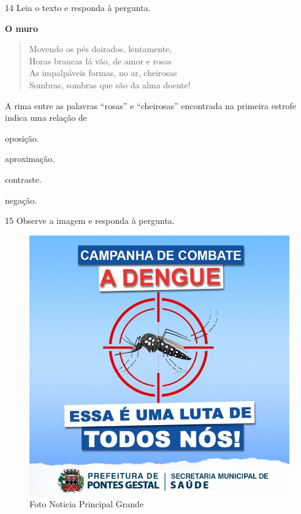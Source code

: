 \num{14} Leia o texto e responda à pergunta.

\textbf{O muro}

\begin{verse}
Movendo os pés doirados, lentamente,\\
Horas brancas lá vão, de amor e rosas\\
As impalpáveis formas, no ar, cheirosas\\
Sombras, sombras que são da alma doente!
\end{verse}


A rima entre as palavras ``rosas'' e ``cheirosas'' encontrada na primeira
estrofe indica uma relação de

\begin{escolha}
  \item oposição.

  \item aproximação.

  \item contraste.

  \item negação.
\end{escolha}

\num{15} Observe a imagem e responda à pergunta.

\begin{figure}
\includegraphics[width=\textwidth]{./imgQ4PORT/media/image3.jpeg}
\caption{Foto Noticia Principal Grande}
\end{figure}

